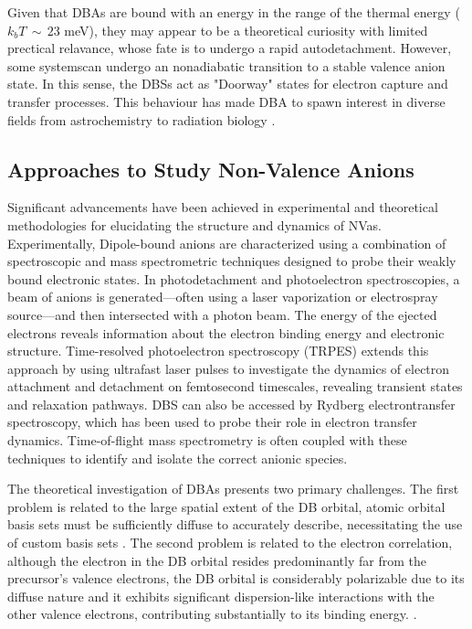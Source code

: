 Given that DBAs are bound with an energy in the range of the thermal energy ($k_bT\,\sim\,23$ meV), they may appear to be a theoretical curiosity with limited prectical relavance, whose fate is to undergo a rapid autodetachment. However, some systemscan undergo an nonadiabatic transition to a stable valence anion state\cite{herbert2015quantum,jordan2003theory}. In this sense, the DBSs act as "Doorway" states for electron capture and transfer processes\cite{sommerfeld2002coupling,jordan2003theory,kang2024reaction}. This behaviour has made DBA to spawn interest in diverse fields from astrochemistry \cite{fortenberry2015interstellar} to radiation biology \cite{narayanan2023secondary,sedmidubska2024interaction}.

\subsection{Approaches to Study Non-Valence Anions}
Significant advancements have been achieved in experimental and theoretical methodologies for elucidating the structure and dynamics of NVas. Experimentally, Dipole-bound anions are characterized using a combination of spectroscopic and mass spectrometric techniques designed to probe their weakly bound electronic states\cite{simons2008molecular}. In photodetachment and photoelectron spectroscopies, a beam of anions is generated—often using a laser vaporization or electrospray source—and then intersected with a photon beam. The energy of the ejected electrons reveals information about the electron binding energy and electronic structure. Time-resolved photoelectron spectroscopy (TRPES) extends this approach by using ultrafast laser pulses to investigate the dynamics of electron attachment and detachment on femtosecond timescales, revealing transient states and relaxation pathways\cite{clarke2024dynamics}. DBS can also be accessed by Rydberg electrontransfer spectroscopy, which has been used to probe their role in electron transfer dynamics\cite{bradforth2002excited}. Time-of-flight mass spectrometry is often coupled with these techniques to identify and isolate the correct anionic species. 

The theoretical investigation of DBAs presents two primary challenges. The first problem is related to the large spatial extent of the DB orbital, atomic orbital basis sets must be sufficiently diffuse to accurately describe, necessitating the use of custom basis sets \cite{skurski2000choose}. The second problem is related to the electron correlation, although the electron in the DB orbital resides predominantly far from the precursor's valence electrons, the DB orbital is considerably polarizable due to its diffuse nature and it exhibits significant dispersion-like interactions with the other valence electrons, contributing substantially to its binding energy. \cite{simons2008molecular,simons2023molecular,gutowski1996contribution}.\\


